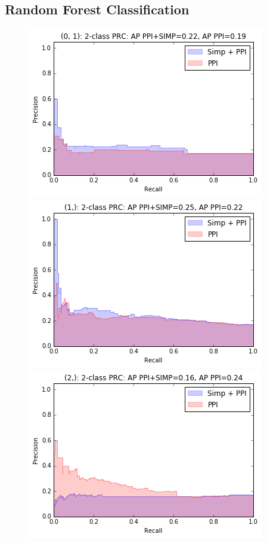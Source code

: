 \documentclass[9pt]{article}
\begin{document}
\subsection{Random Forest Classification}
\begin{figure}[!htb]
  \includegraphics[width=\linewidth]{logisticRegressionGraphs/for1.png}
\endminipage\hfill
{}
  \includegraphics[width=\linewidth]{logisticRegressionGraphs/for2.png}
\endminipage\hfill
{}%
  \includegraphics[width=\linewidth]{logisticRegressionGraphs/for3.png}

\end{figure}
\end{document}
